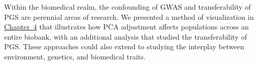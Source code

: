 Within the biomedical realm, the confounding of GWAS and transferability of PGS are perennial areas of research. We presented a method of visualization in \hyperref[chap:chapter4]{Chapter~4} that illustrates how PCA adjustment affects populations across an entire biobank, with an additional analysis that studied the transferability of PGS. These approaches could also extend to studying the interplay between environment, genetics, and biomedical traits.